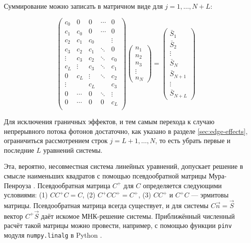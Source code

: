 Суммирование можно записать в матричном виде для $j = 1, \ldots, N + L$:

\begin{equation}
	\begin{pmatrix} 
		c_0   &  0   &  0   &\dotsm&  0     \\
		c_1   & c_0  &  0   &\dotsm&  0     \\
		c_2   & c_1  & c_0  &      & \vdots \\
		c_3   & c_2  & c_1  &\ddots&  0     \\
		\vdots& c_3  & c_2  &\ddots&  c_0   \\
		c_L   &\vdots& c_3  &\ddots&  c_1   \\
		0     & c_L  &\vdots&\ddots&  c_2   \\
		\vdots&      & c_L  &      &  c_3   \\
		0     &\dotsm&  0   &\ddots& \vdots \\
		0     &\dotsm& 0    &   0  &  c_L   \\
	\end{pmatrix}
	\begin{pmatrix} 
		n_1 \\ n_2 \\ n_3 \\ \vdots \\ n_N
	\end{pmatrix}
	=
	\begin{pmatrix} 
		\bar{S}_1 \\ \bar{S}_2 \\
		\vdots \\
		\bar{S}_N \\ \bar{S}_{N+1} \\
		\vdots \\
		\bar{S}_{N+L}
	\end{pmatrix}
	\label{eq:mean-vector-calculation}
\end{equation}

Для исключения граничных эффектов, и тем самым перехода к случаю непрерывного потока фотонов достаточно, как указано в разделе \ref{sec:edge-effects}, ограничиться рассмотрением строк $j = L+1, \ldots, N$, то есть убрать первые и последние $L$ уравнений системы.

Эта, вероятно, несовместная система линейных уравнений, допускает решение в смысле наименьших квадратов с помощью псевдообратной матрицы Мура-Пенроуза \cite{Penrose1956}. Псевдообратная матрица $C^+$ для $C$ определяется следующими условиями: (1) $C C^+ C = C$, (2) $C^+ C C^+ = C^+$, (3) $C C^+$ и $C^+ C$ --- эрмитовы матрицы. Псевдообратная матрица всегда существует, и для системы $C\vec{n} = \vec{S}$ вектор $C^+ \vec{S}$ даёт искомое МНК-решение системы. Приближённый численный расчёт такой матрицы можно провести, например, с помощью функции \verb|pinv| модуля \verb|numpy.linalg| в Python \cite{Harris2020}.

